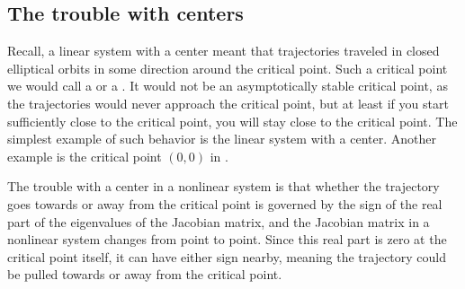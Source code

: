 \subsection{The trouble with centers}

Recall, a linear system with a center meant that trajectories
traveled in closed elliptical orbits
in some direction around the critical point.  Such
a critical point we would call a \emph{} or
a \emph{}.  It would not be an asymptotically 
stable critical point, as the trajectories would never approach the critical
point, but at least if you start sufficiently close to the critical point,
you will stay close to the critical point.  The simplest example of such
behavior is the linear system with a center.  Another
example is the critical point $(0,0)$ in
.

The trouble with a center in a nonlinear system is that whether the
trajectory goes towards or away from the critical point is governed by the
sign of the real part of the eigenvalues of the Jacobian matrix, and the Jacobian
matrix
in a nonlinear system changes from point to point.  Since this real
part is zero at the critical point itself, it can have either sign nearby,
meaning the trajectory could be pulled towards or away from the critical
point.

